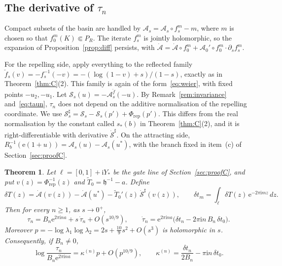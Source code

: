 \documentclass[11pt]{amsart}
\newtheorem{theorem}{Theorem}[section]
\theoremstyle{definition}
\newcommand{\Rr}{R}
\newcommand{\eee}{\mathrm{e}}
\newcommand{\ii}{\mathrm{i}}
\begin{document}
\subsection{The derivative of $\tau_n$}
Compact subsets of the basin are handled by
$\mathcal A_s=\mathcal A_s\circ f_s^m-m$, where $m$ is chosen so that
$f_0^m(K)\Subset P_R$.  The iterate $f_s^m$ is jointly holomorphic, so the
expansion of Proposition~\ref{prop:diff} persists, with
$\dot{\mathcal A}=\dot{\mathcal A}\circ f_0^m+\mathcal A_0'\circ f_0^m\cdot\partial_sf_s^m$.

For the repelling side, apply everything to the reflected family
$\check f_s(v)=-f_s^{-1}(-v)=-(\log(1-v)+s)/(1-s)$, exactly as in
Theorem~\ref{thm:C}(2).  This family is again of the form~\eqref{eq:weier},
with fixed points $-u_2,-u_1$.  Let $\mathcal S_s(u)=-\mathcal A^{\check f}_s(-u)$.  By
Remark~\ref{rem:invariance} and~\eqref{eq:taun}, $\tau_n$ does not depend on the
additive normalisation of the repelling coordinate.  We use
$\mathcal S^\sharp_s=\mathcal S_s-\mathcal S_s(p')+\Phi_{\mathrm{rep}}(p')$.
This differs from the real normalisation by the constant called
$s_*(b)$ in Theorem~\ref{thm:C}(2), and it is right-differentiable with derivative
$\dot{\mathcal S}^\sharp$.  On the attracting side,
$\Rr_b^{-1}(\eee(1+u))=\mathcal A_s(u)-\mathcal A_s(u^*)$, with the branch fixed
in item~(c) of Section~\ref{sec:proofC}.

\begin{theorem}\label{thm:D}
Let $\ell=[0,1]+\ii Y_*$ be the gate line of Section~\ref{sec:proofC}, and put
$v(z)=\Phi_{\mathrm{rep}}^{-1}(z)$ and $\tilde T_0=\mathfrak h^{-1}-a$.  Define
\[
 \delta T(z)=\dot{\mathcal A}(v(z))-\dot{\mathcal A}(u^*)
 -\tilde T_0'(z)\,\dot{\mathcal S}^\sharp(v(z)),\qquad
 \delta t_m=\int_\ell\delta T(z)\,\eee^{-2\pi\ii mz}\,dz .
\]
Then for every $n\ge1$, as $s\to0^+$,
\[
 \tau_n=B_n\eee^{2\pi\ii na}+s\,\dot\tau_n+O(s^{10/9}),\qquad
 \dot\tau_n=\eee^{2\pi\ii na}\bigl(\delta t_n-2\pi\ii n\,B_n\,\delta t_0\bigr).
\]
Moreover $p=-\log\lambda_1\log\lambda_2=2s+\tfrac{10}9s^2+O(s^3)$ is
holomorphic in $s$.  Consequently, if $B_n\ne0$,
\[
 \log\frac{\tau_n}{B_n\eee^{2\pi\ii na}}=\kappa^{(n)}p+O(p^{10/9}),\qquad
 \kappa^{(n)}=\frac{\delta t_n}{2B_n}-\pi\ii n\,\delta t_0 .
\]
\end{theorem}
\end{document}
